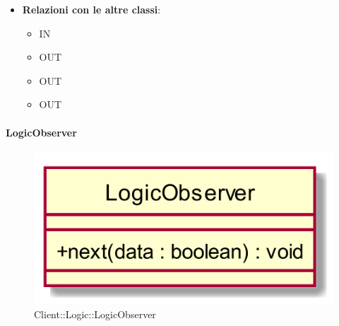 \begin{itemize}
\begin{itemize}
	\end{itemize}
	\item \textbf{Relazioni con le altre classi}:
	\begin{itemize}
		\item IN \hyperlink{DataArrivedSubject_label}{}
		\item OUT \hyperlink{HttpError_label}{}
		\item OUT \hyperlink{HttpPromise_label}{}
		\item OUT \hyperlink{DataArrivedSubject_label}{}
	\end{itemize}
\end{itemize}

\hypertarget{LogicObserver_label}{\paragraph{LogicObserver}}
\begin{figure}[h]
	\centering
	\includegraphics[width=\textwidth,height=\textheight,keepaspectratio]{images/ClassLogicObserver.png}
	\caption{Client::Logic::LogicObserver}
\end{figure}
